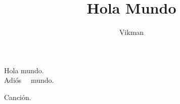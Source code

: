 \documentclass[12pt,a4paper]{article}
\author{Vikman}
\title{Hola Mundo}
\begin{document}

\maketitle

Hola mundo. \\
Adiós \ \ mundo.

Canción.
\end{document}
